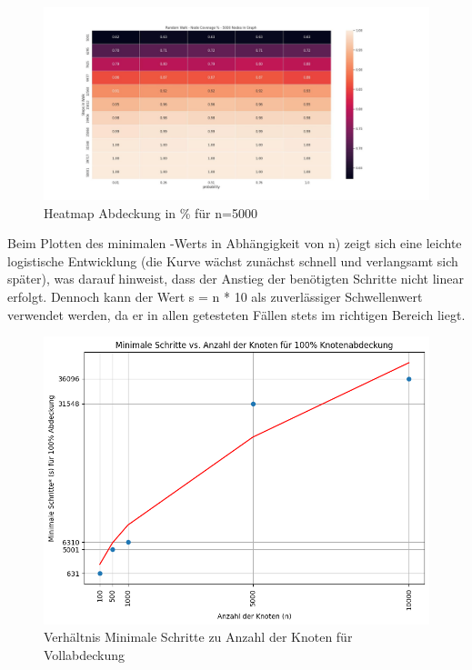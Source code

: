 \begin{figure}
    \centering
    \includegraphics[width=\textwidth]{template/chapters/heatmap_lengths_unconnected_5000.jpg}
    \caption{Heatmap Abdeckung in \% für n=5000}
    \label{fig:cov5000}
\end{figure}

Beim Plotten des minimalen -Werts in Abhängigkeit von n) zeigt sich eine leichte logistische Entwicklung (die Kurve wächst zunächst schnell und verlangsamt sich später), was darauf hinweist, dass der Anstieg der benötigten Schritte nicht linear erfolgt. Dennoch kann der Wert s = n * 10 als zuverlässiger Schwellenwert verwendet werden, da er in allen getesteten Fällen stets im richtigen Bereich liegt. 

\begin{figure}
    \centering
    \includegraphics[width=\textwidth]{template/chapters/MinimaleSchritte-vs-AnzahlKnoten-Vollabdeckung.png}
    \caption{Verhältnis Minimale Schritte zu Anzahl der Knoten für Vollabdeckung}
    \label{fig:minsteps}
\end{figure}

